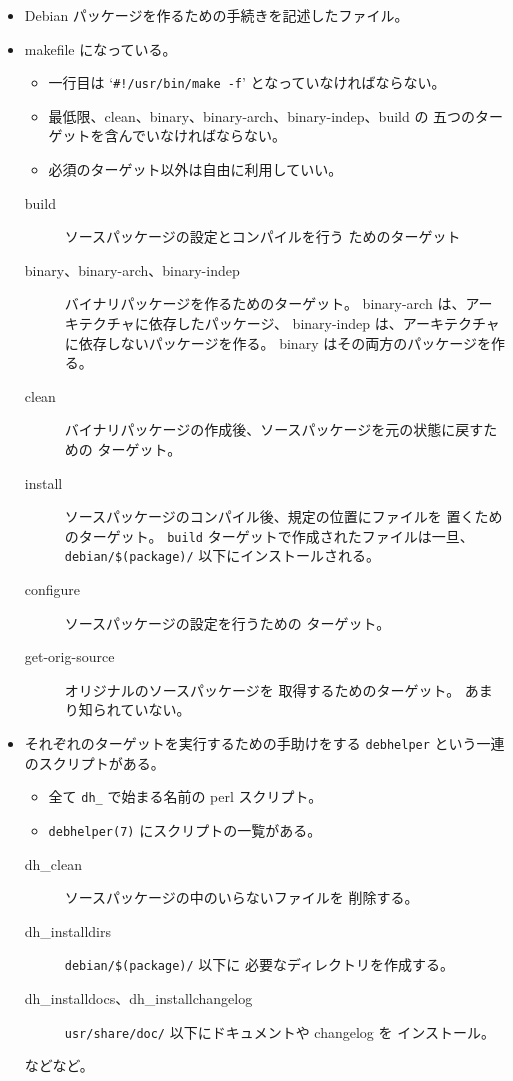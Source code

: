 \documentclass[mingoth,a4paper]{jsarticle}
\begin{document}
\begin{itemize}
\item Debian パッケージを作るための手続きを記述したファイル。
\item makefile になっている。
  \begin{itemize}
  \item 一行目は `\texttt{\#!/usr/bin/make -f}' となっていなければならない。
  \item 最低限、clean、binary、binary-arch、binary-indep、build の
    五つのターゲットを含んでいなければならない。
  \item 必須のターゲット以外は自由に利用していい。
  \end{itemize}
  \begin{description}
  \item[{\ttfamily{}build}] ソースパッケージの設定とコンパイルを行う
    ためのターゲット
  \item[{\ttfamily{}binary、binary-arch、binary-indep}]
    バイナリパッケージを作るためのターゲット。
    binary-arch は、アーキテクチャに依存したパッケージ、
    binary-indep は、アーキテクチャに依存しないパッケージを作る。
    binary はその両方のパッケージを作る。
  \item[{\ttfamily{}clean}] 
    バイナリパッケージの作成後、ソースパッケージを元の状態に戻すための
    ターゲット。
  \item[{\ttfamily{}install}]
    ソースパッケージのコンパイル後、規定の位置にファイルを
    置くためのターゲット。
    \texttt{build} ターゲットで作成されたファイルは一旦、
    \texttt{debian/\$(package)/} 以下にインストールされる。
  \item[{\ttfamily{}configure}] ソースパッケージの設定を行うための
    ターゲット。
  \item[{\ttfamily{}get-orig-source}] オリジナルのソースパッケージを
    取得するためのターゲット。
    あまり知られていない。
  \end{description}
\item それぞれのターゲットを実行するための手助けをする
  \texttt{debhelper} という一連のスクリプトがある。
  \begin{itemize}
  \item 全て \texttt{dh\_} で始まる名前の perl スクリプト。
  \item \texttt{debhelper(7)} にスクリプトの一覧がある。
  \end{itemize}
  \begin{description}
  \item[\ttfamily{}dh\_clean] ソースパッケージの中のいらないファイルを
    削除する。
  \item[\ttfamily{}dh\_installdirs] \texttt{debian/\$(package)/} 以下に
    必要なディレクトリを作成する。
  \item[\ttfamily{}dh\_installdocs、dh\_installchangelog]
    \texttt{usr/share/doc/} 以下にドキュメントや changelog を
    インストール。
  \end{description}
  などなど。
\end{itemize}
\end{document}
